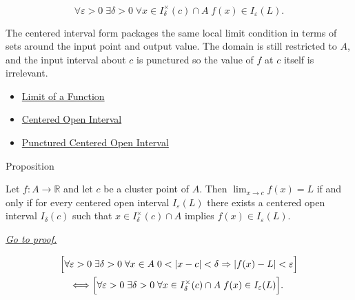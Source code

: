 \begin{remark*}
\[
  \forall\varepsilon>0\;\exists\delta>0\;\forall x\in I_\delta^\times(c)\cap A\;
  f(x)\in I_\varepsilon(L).
\]
\end{remark*}

\begin{remark*}[Interpretation]
The centered interval form packages the same local limit condition in
terms of sets around the input point and output value. The domain is
still restricted to $A$, and the input interval about $c$ is punctured so
the value of $f$ at $c$ itself is irrelevant.
\end{remark*}

\begin{dependencies}
\begin{itemize}
  \item \hyperref[def:limit-function]{Limit of a Function}
  \item \hyperref[def:epsilon-neighbourhood]{Centered Open Interval}
  \item \hyperref[def:deleted-epsilon-neighbourhood]{Punctured Centered Open Interval}
\end{itemize}
\end{dependencies}


\begin{propositionbox}{Proposition}
\begin{proposition}
\label{prop:limit-neighbourhood-equiv}
Let $f : A \to \mathbb{R}$ and let $c$ be a cluster point of $A$.
Then $\lim_{x\to c}f(x)=L$ if and only if for every
centered open interval $I_\varepsilon(L)$ there exists a centered
open interval $I_\delta(c)$ such that
$x\in I_\delta^\times(c)\cap A$ implies $f(x)\in I_\varepsilon(L)$.

\smallskip\noindent
\hyperref[prf:limit-neighbourhood-equiv]{\textit{Go to proof.}}
\end{proposition}
\end{propositionbox}

\begin{remark*}
\[
\begin{aligned}
&\Bigl[\forall\varepsilon>0\;\exists\delta>0\;\forall x\in A\;
  0<|x-c|<\delta\Rightarrow |f(x)-L|<\varepsilon\Bigr] \\
&\quad\Longleftrightarrow
\Bigl[\forall\varepsilon>0\;\exists\delta>0\;\forall x\in I_\delta^\times(c)\cap A\;
  f(x)\in I_\varepsilon(L)\Bigr].
\end{aligned}
\]
\end{remark*}

